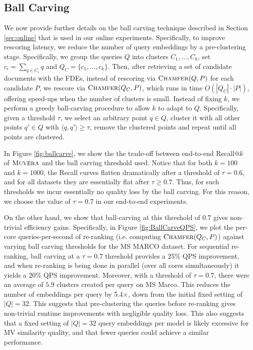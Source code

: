 


\subsection{Ball Carving}\label{apx:ballcarve}
We now provide further details on the ball carving technique described in Section \ref{sec:online} that is used in our online experiments. Specifically, to improve rescoring latency, we reduce the number of query embeddings by a pre-clustering stage. Specifically, we group the queries $Q$ into clusters  $C_1,\dots,C_{k}$, set $c_i = \sum_{q\in C_i} q$ and $Q_C = \{c_1,\dots,c_{k}\}$. Then, after retrieving a set of candidate documents with the FDEs, instead of rescoring via $\textsc{Chamfer}(Q,P)$ for each candidate $P$, we rescore via $\textsc{Chamfer}(Q_C, P)$, which runs in time $O(|Q_C| \cdot |P|)$, offering speed-ups when the number of clusters is small. Instead of fixing $k$, we perform a greedy ball-carving procedure to allow $k$ to adapt to $Q$. Specifically, given a threshold $\tau$, we select an arbitrary point $q \in Q$, cluster it with all other points $q' \in Q$ with $\langle q,q'\rangle \geq \tau$, remove the clustered points and repeat until all points are clustered. 


In Figure \ref{fig:ballcarve}, we show the the trade-off between end-to-end Recall$@k$ of $\textsc{Muvera}$ and the ball carving threshold used. Notice that for both $k=100$ and $k=1000$, the Recall curves flatten dramatically after a threshold of $\tau = 0.6$, and for all datasets they are essentially flat after $\tau \geq 0.7$.  Thus, for such thresholds we incur essentially no quality loss by the ball carving. For this reason, we choose the value of $\tau = 0.7$ in our end-to-end experiments.

 On the other hand, we show that ball-carving at this threshold of $0.7$ gives non-trivial efficiency gains. Specifically, in Figure \ref{fig:BallCarveQPS}, we plot the per-core queries-per-second of re-ranking (i.e. computing $\textsc{Chamfer}(Q_C, P)$) against varying ball carving thresholds for the MS MARCO dataset. For sequential re-ranking, ball carving at a $\tau = 0.7$ threshold provides a $25\%$ QPS improvement, and when re-ranking is being done in parallel (over all cores simultaneously) it yields a 20$\%$ QPS improvement. Moreover, with a threshold of $\tau = 0.7$, there were an average of $5.9$ clusters created per query on MS Marco. This reduces the number of embeddings per query by 5.4$\times$, down from the initial fixed setting of $|Q| = 32$.  This suggests that pre-clustering the queries before re-ranking gives non-trivial runtime improvements with negligible quality loss.  This also suggests that a fixed setting of $|Q| = 32$ query embeddings per model is likely excessive for MV similarity quality, and that fewer queries could achieve a similar performance. 




